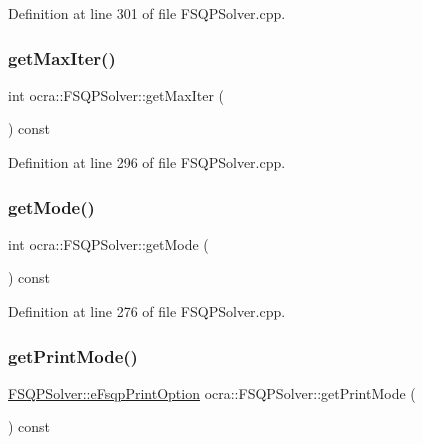 Definition at line 301 of file F\+S\+Q\+P\+Solver.\+cpp.

\hypertarget{classocra_1_1FSQPSolver_a8eddfbb44147ea2ea7ee98479a81a2d1}{}\label{classocra_1_1FSQPSolver_a8eddfbb44147ea2ea7ee98479a81a2d1} 
\subsubsection{\texorpdfstring{get\+Max\+Iter()}{getMaxIter()}}
{\footnotesize\ttfamily int ocra\+::\+F\+S\+Q\+P\+Solver\+::get\+Max\+Iter (\begin{DoxyParamCaption}{ }\end{DoxyParamCaption}) const}



Definition at line 296 of file F\+S\+Q\+P\+Solver.\+cpp.

\hypertarget{classocra_1_1FSQPSolver_a2ac151a7e6e43884a470dd9a373fadb9}{}\label{classocra_1_1FSQPSolver_a2ac151a7e6e43884a470dd9a373fadb9} 
\subsubsection{\texorpdfstring{get\+Mode()}{getMode()}}
{\footnotesize\ttfamily int ocra\+::\+F\+S\+Q\+P\+Solver\+::get\+Mode (\begin{DoxyParamCaption}{ }\end{DoxyParamCaption}) const}



Definition at line 276 of file F\+S\+Q\+P\+Solver.\+cpp.

\hypertarget{classocra_1_1FSQPSolver_a1511084f712ea3030b38cb6ce626118d}{}\label{classocra_1_1FSQPSolver_a1511084f712ea3030b38cb6ce626118d} 
\subsubsection{\texorpdfstring{get\+Print\+Mode()}{getPrintMode()}}
{\footnotesize\ttfamily \hyperlink{classocra_1_1FSQPSolver_a4bb0d1e3b6b82bd9f683c6c7393f062d}{F\+S\+Q\+P\+Solver\+::e\+Fsqp\+Print\+Option} ocra\+::\+F\+S\+Q\+P\+Solver\+::get\+Print\+Mode (\begin{DoxyParamCaption}{ }\end{DoxyParamCaption}) const}



